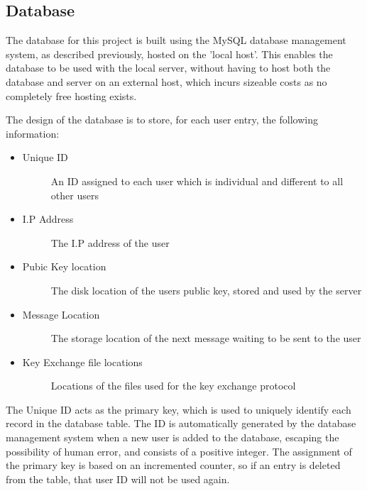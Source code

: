 \documentclass[a4paper,10pt]{report}
\begin{document}
\subsection{Database}

The database for this project is built using the MySQL database management system, as described previously, hosted on the 'local host'. This enables the database to be used with the local server, without having to host both the database and server on an external host, which incurs sizeable costs as no completely free hosting exists. 

The design of the database is to store, for each user entry, the following information:

\begin{itemize}
 \item\begin{description}
   \item[Unique ID] An ID assigned to each user which is individual and different to all other users 
 \end{description} 
 \item\begin{description}
   \item[I.P Address] The I.P address of the user 
 \end{description}
 \item\begin{description}
   \item[Pubic Key location] The disk location of the users public key, stored and used by the server 
 \end{description}
 \item\begin{description}
   \item[Message Location] The storage location of the next message waiting to be sent to the user
 \end{description}
 \item\begin{description}
   \item[Key Exchange file locations] Locations of the files used for the key exchange protocol 
 \end{description}
\end{itemize}


The Unique ID acts as the primary key, which is used to uniquely identify each record in the database table. The ID is automatically generated by the database management system when a new user is added to the database, escaping the possibility of human error, and consists of a positive integer. The assignment of the primary key is based on an incremented counter, so if an entry is deleted from the table, that user ID will not be used again.
\end{document}
